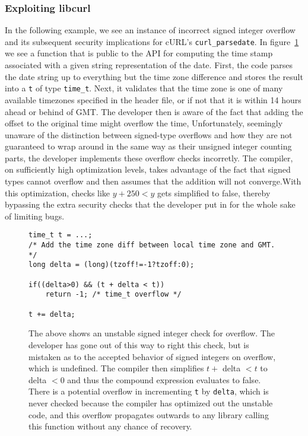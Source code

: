 \documentclass[9pt,twocolumn]{article}
\begin{document}
\subsubsection{Exploiting libcurl}
In the following example, we see an instance of incorrect signed integer overflow and its subsequent security implications for cURL's \texttt{curl\_parsedate}. In figure~\ref{fig:libcurl1} we see a function that is public to the API for computing the time stamp associated with a given string representation of the date. First, the code parses the date string up to everything but the time zone difference and stores the result into a \texttt{t} of type \texttt{time\_t}. Next, it validates that the time zone is one of many available timezones specified in the header file, or if not that it is within 14 hours ahead or behind of GMT. The developer then is aware of the fact that adding the offset to the original time might overflow the time, Unfortunately, seemingly unaware of the distinction between signed-type overflows and how they are not guaranteed to wrap around in the same way as their unsigned integer counting parts, the developer implements these overflow checks incorretly. The compiler, on sufficiently high optimization levels, takes advantage of the fact that signed types cannot overflow and then assumes that the addition will not converge.With this optimization, checks like $y + 250 < y$ gets simplified to false, thereby bypassing the extra security checks that the developer put in for the whole sake of limiting bugs.

\begin{figure}[h]
\begin{lstlisting}
time_t t = ...;
/* Add the time zone diff between local time zone and GMT. */
long delta = (long)(tzoff!=-1?tzoff:0);
 
if((delta>0) && (t + delta < t))
    return -1; /* time_t overflow */
 
t += delta;
\end{lstlisting}
\label{fig:libcurl1}
\caption{The above shows an unstable signed integer check for overflow. The developer has gone out of this way to right this check, but is mistaken as to the accepted behavior of signed integers on overflow, which is undefined. The compiler then simplifies $ t  + $ delta $ < t$ to delta $ < 0$ and thus the compound expression evaluates to false. There is a potential overflow in incrementing \texttt{t} by \texttt{delta}, which is never checked because the compiler has optimized out the unstable code, and this overflow propagates outwards to any library calling this function without any chance of recovery.}
\end{figure}
\end{document}

